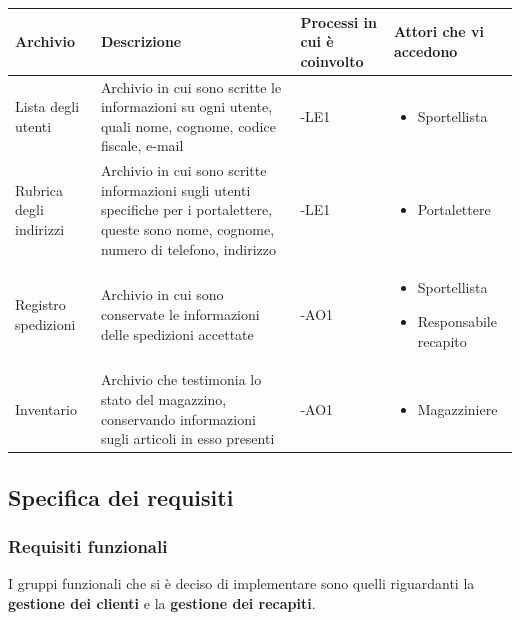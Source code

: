 \begin{table}
  \centering
  \begin{tabular}{|>{\centering\arraybackslash}m{}|
                  >{\centering\arraybackslash}m{}|
                  >{\centering\arraybackslash}m{}|
                  >{\centering\arraybackslash}m{}|}
    \hline
    \textbf{Archivio} & \textbf{Descrizione} & \textbf{Processi in cui è coinvolto} & \textbf{Attori che vi accedono} \\ \hline
    Lista degli utenti & Archivio in cui sono scritte le informazioni su ogni utente, quali nome, cognome, codice fiscale, e-mail & -LE1 & \begin{itemize}
      \item Sportellista
    \end{itemize} \\ 
    \hline 
    Rubrica degli indirizzi & Archivio in cui sono scritte informazioni sugli utenti specifiche per i portalettere, queste sono nome, cognome, numero di telefono,
    indirizzo & -LE1 & \begin{itemize}
      \item Portalettere
    \end{itemize} \\ 
    \hline
    Registro spedizioni & Archivio in cui sono conservate le informazioni delle spedizioni accettate & -AO1 &
    \begin{itemize}
      \item{Sportellista}
      \item{Responsabile recapito}
    \end{itemize} \\
    \hline
    Inventario & Archivio che testimonia lo stato del magazzino, conservando informazioni sugli articoli in esso presenti & -AO1 &
    \begin{itemize}
      \item{Magazziniere}
    \end{itemize} \\
    \hline
  \end{tabular}
\end{table}

\newpage
\subsection{Specifica dei requisiti}
\subsubsection*{Requisiti funzionali}
I gruppi funzionali che si è deciso di implementare sono quelli riguardanti la \textbf{gestione dei clienti} e la \textbf{gestione dei recapiti}.

